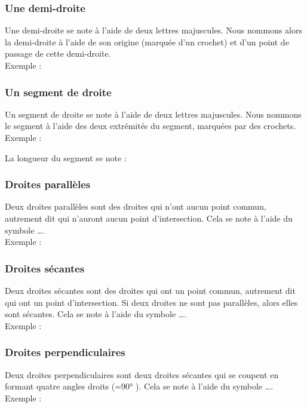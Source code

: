 \documentclass[../../syllabus_1.tex]{subfiles}
\begin{document}
\subsubsection{Une demi-droite}
Une demi-droite se note à l'aide de deux lettres majuscules. Nous nommons alors la demi-droite à l'aide de son origine (marquée d'un crochet) et d'un point de passage de cette demi-droite. \\
Exemple : 
\vspace{2cm}

\subsubsection{Un segment de droite}
Un segment de droite se note à l'aide de deux lettres majuscules. Nous nommons le segment à l'aide des deux extrémités du segment, marquées par des crochets. \\
Exemple : 
\vspace{2cm}

La longueur du segment se note :

\subsubsection{Droites parallèles}
Deux droites parallèles sont des droites qui n'ont aucun point commun, autrement dit qui n'auront aucun point d'intersection. Cela se note à l'aide du symbole \ldots .\\
Exemple : 
\vspace{2cm}

\subsubsection{Droites sécantes}
Deux droites sécantes sont des droites qui ont un point commun, autrement dit qui ont un point d'intersection. Si deux droites ne sont pas parallèles, alors elles sont sécantes. Cela se note à l'aide du symbole \ldots .\\
Exemple : 
\vspace{2cm}

\subsubsection{Droites perpendiculaires}
Deux droites perpendiculaires sont deux droites sécantes qui se coupent en formant quatre angles droits (=90° ). Cela se note à l'aide du symbole \ldots . \\
Exemple : 
\vspace{2cm}
\end{document}
